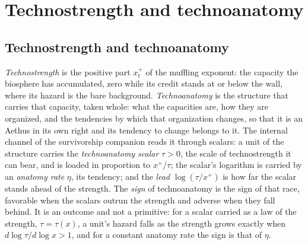 \section{Technostrength and technoanatomy}\label{sec:coords}

\subsection{Technostrength and technoanatomy}\label{gr:sub:coords}

\begin{definition}\label{gr:def:coords}
\emph{Technostrength} is the positive part $x_t^+$ of the muffling
exponent: the capacity the biosphere has accumulated, zero while its
credit stands at or below the wall, where its hazard is the bare
background. \emph{Technoanatomy} is the structure that carries that
capacity, taken whole: what the capacities are, how they are organized,
and the tendencies by which that organization changes, so that it is an
Aethus in its own right and its tendency to change belongs to it. The
internal channel of the survivorship companion
\cite{GoldenSurvivorship} reads it through scalars: a unit of the
structure carries the \emph{technoanatomy scalar} $\tau>0$, the scale of
technostrength it can bear, and is loaded in proportion to $x^+/\tau$;
the scalar's logarithm is carried by an \emph{anatomy rate} $\eta$, its
tendency; and the \emph{lead} $\log(\tau/x^+)$ is how far the scalar
stands ahead of the strength. The \emph{sign} of technoanatomy is the
sign of that race, favorable when the scalars outrun the strength and
adverse when they fall behind. It is an outcome and not a primitive: for
a scalar carried as a law of the strength, $\tau=\tau(x)$, a unit's
hazard falls as the strength grows exactly when $d\log\tau/d\log x>1$,
and for a constant anatomy rate the sign is that of $\eta$.


\end{definition}
